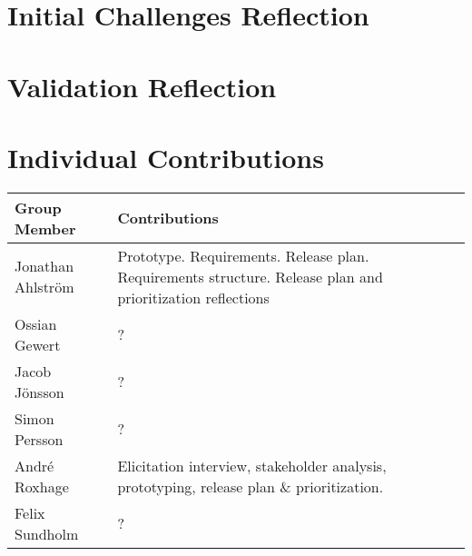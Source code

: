 \documentclass[a4paper]{article}
\begin{document}
\section{Initial Challenges Reflection}


\section{Validation Reflection}


\section*{Individual Contributions}

\begin{tabular}{|l|p{10cm}|}
    \hline
    \textbf{Group Member} & \textbf{Contributions} \\
    \hline
    Jonathan Ahlström & Prototype. Requirements. Release plan. Requirements structure. Release plan and prioritization reflections \\
    \hline
    Ossian Gewert & ? \\
    \hline
    Jacob Jönsson & ? \\
    \hline
    Simon Persson & ? \\
    \hline
    André Roxhage & Elicitation interview, stakeholder analysis, prototyping, release plan \& prioritization.  \\
    \hline
    Felix Sundholm & ? \\
    \hline
\end{tabular}
\end{document}
